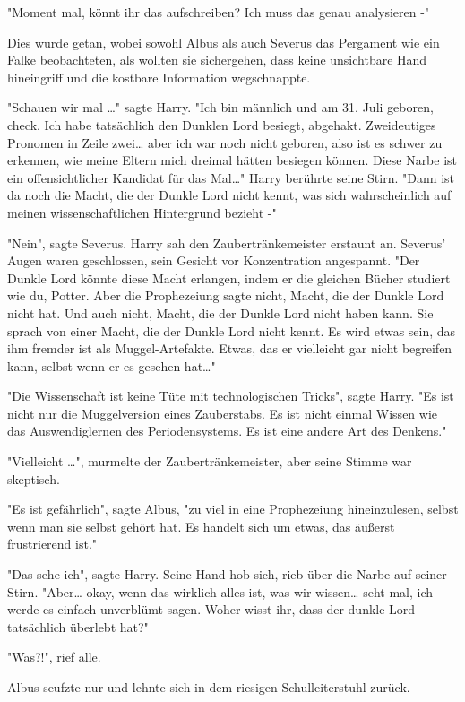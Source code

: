 {"Moment mal, könnt ihr das aufschreiben? Ich muss das genau analysieren -"

Dies wurde getan, wobei sowohl Albus als auch Severus das Pergament wie ein Falke beobachteten, als wollten sie sichergehen, dass keine unsichtbare Hand hineingriff und die kostbare Information wegschnappte.

"Schauen wir mal …" sagte Harry. "Ich bin männlich und am 31. Juli geboren, check. Ich habe tatsächlich den Dunklen Lord besiegt, abgehakt. Zweideutiges Pronomen in Zeile zwei… aber ich war noch nicht geboren, also ist es schwer zu erkennen, wie meine Eltern mich dreimal hätten besiegen können. Diese Narbe ist ein offensichtlicher Kandidat für das Mal…" Harry berührte seine Stirn. "Dann ist da noch die Macht, die der Dunkle Lord nicht kennt, was sich wahrscheinlich auf meinen wissenschaftlichen Hintergrund bezieht -"

"Nein", sagte Severus. Harry sah den Zaubertränkemeister erstaunt an. Severus' Augen waren geschlossen, sein Gesicht vor Konzentration angespannt. "Der Dunkle Lord könnte diese Macht erlangen, indem er die gleichen Bücher studiert wie du, Potter. Aber die Prophezeiung sagte nicht, Macht, die der Dunkle Lord nicht hat. Und auch nicht, Macht, die der Dunkle Lord nicht haben kann. Sie sprach von einer Macht, die der Dunkle Lord nicht kennt. Es wird etwas sein, das ihm fremder ist als Muggel-Artefakte. Etwas, das er vielleicht gar nicht begreifen kann, selbst wenn er es gesehen hat…"

"Die Wissenschaft ist keine Tüte mit technologischen Tricks", sagte Harry. "Es ist nicht nur die Muggelversion eines Zauberstabs. Es ist nicht einmal Wissen wie das Auswendiglernen des Periodensystems. Es ist eine andere Art des Denkens."

"Vielleicht …", murmelte der Zaubertränkemeister, aber seine Stimme war skeptisch.

"Es ist gefährlich", sagte Albus, "zu viel in eine Prophezeiung hineinzulesen, selbst wenn man sie selbst gehört hat. Es handelt sich um etwas, das äußerst frustrierend ist."

"Das sehe ich", sagte Harry. Seine Hand hob sich, rieb über die Narbe auf seiner Stirn. "Aber… okay, wenn das wirklich alles ist, was wir wissen… seht mal, ich werde es einfach unverblümt sagen. Woher wisst ihr, dass der dunkle Lord tatsächlich überlebt hat?"

"Was?!", rief alle.

Albus seufzte nur und lehnte sich in dem riesigen Schulleiterstuhl zurück.

}
